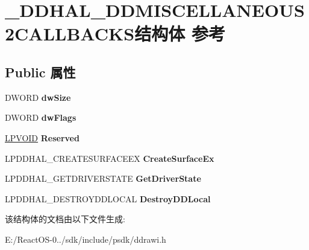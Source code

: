 \hypertarget{struct___d_d_h_a_l___d_d_m_i_s_c_e_l_l_a_n_e_o_u_s2_c_a_l_l_b_a_c_k_s}{}\section{\+\_\+\+D\+D\+H\+A\+L\+\_\+\+D\+D\+M\+I\+S\+C\+E\+L\+L\+A\+N\+E\+O\+U\+S2\+C\+A\+L\+L\+B\+A\+C\+K\+S结构体 参考}
\label{struct___d_d_h_a_l___d_d_m_i_s_c_e_l_l_a_n_e_o_u_s2_c_a_l_l_b_a_c_k_s}
\subsection*{Public 属性}
\begin{DoxyCompactItemize}
\item 
\mbox{\label{struct___d_d_h_a_l___d_d_m_i_s_c_e_l_l_a_n_e_o_u_s2_c_a_l_l_b_a_c_k_s_a1a996b54a7b7f9198bc88aaade5cd8e3}} 
D\+W\+O\+RD {\bfseries dw\+Size}
\item 
\mbox{\label{struct___d_d_h_a_l___d_d_m_i_s_c_e_l_l_a_n_e_o_u_s2_c_a_l_l_b_a_c_k_s_a5d9f23e254dafbba0ac3d6d75df0d7c0}} 
D\+W\+O\+RD {\bfseries dw\+Flags}
\item 
\mbox{\label{struct___d_d_h_a_l___d_d_m_i_s_c_e_l_l_a_n_e_o_u_s2_c_a_l_l_b_a_c_k_s_a19ff851c606f955ec85ad108247e084b}} 
\hyperlink{interfacevoid}{L\+P\+V\+O\+ID} {\bfseries Reserved}
\item 
\mbox{\label{struct___d_d_h_a_l___d_d_m_i_s_c_e_l_l_a_n_e_o_u_s2_c_a_l_l_b_a_c_k_s_a090c24020b2d1f42a4a24b1cbd7ca602}} 
L\+P\+D\+D\+H\+A\+L\+\_\+\+C\+R\+E\+A\+T\+E\+S\+U\+R\+F\+A\+C\+E\+EX {\bfseries Create\+Surface\+Ex}
\item 
\mbox{\label{struct___d_d_h_a_l___d_d_m_i_s_c_e_l_l_a_n_e_o_u_s2_c_a_l_l_b_a_c_k_s_a18863356209e3ad617b4afbdba0207a1}} 
L\+P\+D\+D\+H\+A\+L\+\_\+\+G\+E\+T\+D\+R\+I\+V\+E\+R\+S\+T\+A\+TE {\bfseries Get\+Driver\+State}
\item 
\mbox{\label{struct___d_d_h_a_l___d_d_m_i_s_c_e_l_l_a_n_e_o_u_s2_c_a_l_l_b_a_c_k_s_a6e7baea287cab6b3905b6656fb68eb7f}} 
L\+P\+D\+D\+H\+A\+L\+\_\+\+D\+E\+S\+T\+R\+O\+Y\+D\+D\+L\+O\+C\+AL {\bfseries Destroy\+D\+D\+Local}
\end{DoxyCompactItemize}


该结构体的文档由以下文件生成\+:\begin{DoxyCompactItemize}
\item 
E\+:/\+React\+O\+S-\/0../sdk/include/psdk/ddrawi.\+h\end{DoxyCompactItemize}
